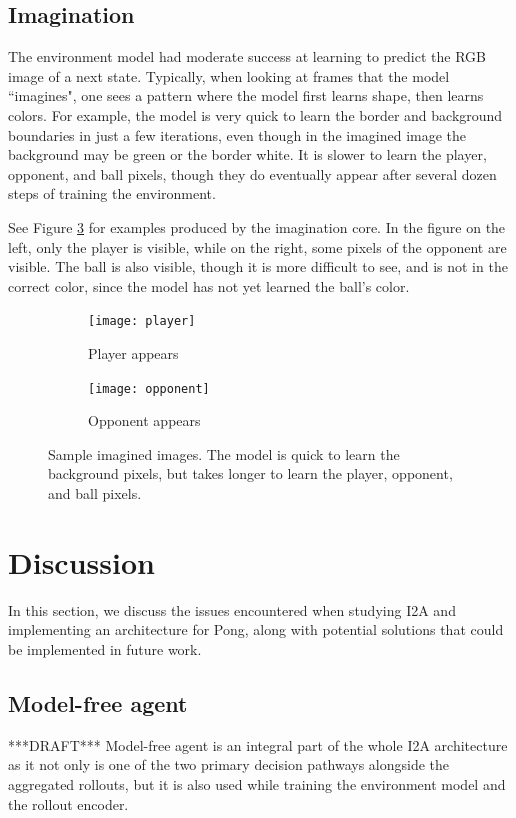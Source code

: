 \documentclass[10pt, twocolumn]{article}
\begin{document}
\subsection{Imagination}

The environment model had moderate success at learning to predict the RGB image of a next state. Typically, when looking at frames
that the model ``imagines", one sees a pattern where the model first learns shape, then learns colors. For example, the model is very quick to learn the border and background boundaries in just a few iterations, even though in the imagined image the background may be green or the border white. It is slower to learn the player, opponent, and ball pixels, though they do eventually appear after several dozen steps of training the environment.

See Figure \ref{imagination} for examples produced by the imagination core. In the figure on the left, only the player is visible, while on the right, some pixels of the opponent are visible. The ball is also visible, though it is more difficult to see, and is not in the correct color, since the model has not yet learned the ball's color.

\begin{figure}[h]
\centering
\begin{subfigure}[b]{.2\textwidth}
  \centering
  \texttt{[image: player]}
  \caption{Player appears}
  \label{fig:player}
\end{subfigure} 
\begin{subfigure}[b]{.2\textwidth}
  \centering
  \texttt{[image: opponent]}
  \caption{Opponent appears}
  \label{fig:opponent}
\end{subfigure} \hfill
\caption{Sample imagined images. The model is quick to learn the background pixels, but takes longer to learn the player, opponent, and ball pixels.}
\label{imagination}
\end{figure}

\section{Discussion}

In this section, we discuss the issues encountered when studying I2A and implementing an architecture for Pong, along with potential solutions that could be implemented in future work.

\subsection{Model-free agent}
***DRAFT***
Model-free agent is an integral part of the whole I2A architecture as it not only is one of the two primary decision pathways alongside the aggregated rollouts, but it is also used while training the environment model and the rollout encoder.
\end{document}
